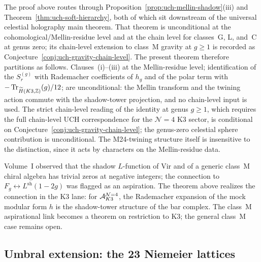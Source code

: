\begin{remark}
\label{rem:shadow-tower-moonshine-uch-scope}
The proof above routes through Proposition~\ref{prop:uch-mellin-shadow}(iii)
and Theorem~\ref{thm:uch-soft-hierarchy}, both of which sit downstream of
the universal celestial holography main theorem. That theorem is
unconditional at the cohomological/Mellin-residue level and at the
chain level for classes~G, L, and~C at genus zero; its chain-level
extension to class~M gravity at $g \geq 1$ is recorded as
Conjecture~\ref{conj:uch-gravity-chain-level}. The present theorem
therefore partitions as follows. Clauses~(i)--(iii) at the Mellin-residue
level; identification of the $S_r^{(g)}$ with Rademacher coefficients
of $h_g$ and of the polar term with
$-\operatorname{Tr}_{\widetilde H(K3,\mathbb Z)}(g)/12$; are unconditional: the Mellin
transform and the twining action commute with the shadow-tower
projection, and no chain-level input is used. The strict chain-level
reading of the identity at genus $g \geq 1$, which requires the full
chain-level UCH correspondence for the $\mathcal{N}{=}4$ K3 sector,
is conditional on Conjecture~\ref{conj:uch-gravity-chain-level};
the genus-zero celestial sphere contribution is unconditional.
The M24-twining structure itself is insensitive to the distinction,
since it acts by characters on the Mellin-residue data.
\end{remark}

\begin{remark}
\label{rem:cmb-shadow-L-function-closure}
Volume~I observed that the shadow $L$-function of Vir and of a
generic class~M chiral algebra has trivial zeros at negative integers;
the connection to $F_g \leftrightarrow L^{\mathrm{sh}}(1-2g)$ was
flagged as an aspiration. The theorem above realizes the connection
in the K3 lane: for $\mathcal A^{\mathcal{N}{=}4}_{K3}$, the Rademacher
expansion of the mock modular form $h$ is the shadow-tower
structure of the bar complex. The class~M aspirational link
becomes a theorem on restriction to K3; the general class~M case
remains open.
\end{remark}

\subsection{Umbral extension: the 23 Niemeier lattices}
\label{subsec:cmb-umbral}

